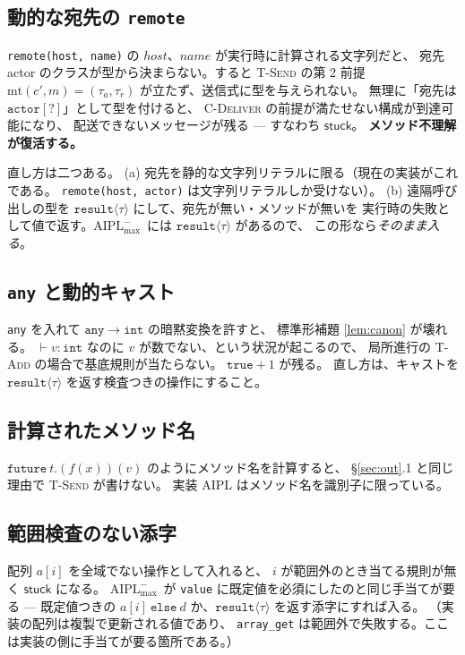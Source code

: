 \documentclass[11pt,a4paper]{ltjsarticle}
\theoremstyle{definition}
\theoremstyle{remark}
\newcommand{\tint}{\ensuremath{\mathtt{int}}}
\newcommand{\tact}[1]{\ensuremath{\mathtt{actor}[#1]}}
\newcommand{\tres}[1]{\ensuremath{\mathtt{result}\langle #1 \rangle}}
\newcommand{\mtab}{\mathrm{mt}}
\newcommand{\stuck}{\textsf{stuck}}
\newcommand{\Amax}{\ensuremath{\mathrm{AIPL}^{-}_{\max}}}
\begin{document}
\subsection{動的な宛先の \texttt{remote}}

\texttt{remote(host, name)} の $host$、$name$ が実行時に計算される文字列だと、
宛先 actor のクラスが型から決まらない。すると \textsc{T-Send} の第 2 前提
$\mtab(c',m) = (\tau_a,\tau_r)$ が立たず、送信式に型を与えられない。
無理に「宛先は \tact{?}」として型を付けると、
\textsc{C-Deliver} の前提が満たせない構成が到達可能になり、
配送できないメッセージが残る --- すなわち $\stuck$。
\textbf{メソッド不理解が復活する。}

直し方は二つある。
(a) 宛先を静的な文字列リテラルに限る（現在の実装がこれである。
    \texttt{remote(host, actor)} は文字列リテラルしか受けない）。
(b) 遠隔呼び出しの型を \tres{\tau} にして、宛先が無い・メソッドが無いを
    実行時の失敗として値で返す。\Amax\ には \tres{\tau} があるので、
    この形なら\emph{そのまま入る}。

\subsection{\texttt{any} と動的キャスト}

\texttt{any} を入れて $\mathtt{any} \to \tint$ の暗黙変換を許すと、
標準形補題 \ref{lem:canon} が壊れる。
$\vdash v : \tint$ なのに $v$ が数でない、という状況が起こるので、
局所進行の \textsc{T-Add} の場合で基底規則が当たらない。
$\mathtt{true} + 1$ が残る。
直し方は、キャストを \tres{\tau} を返す検査つきの操作にすること。

\subsection{計算されたメソッド名}

$\mathtt{future}\ t.(f(x))(v)$ のようにメソッド名を計算すると、
\S\ref{sec:out}.1 と同じ理由で \textsc{T-Send} が書けない。
実装 AIPL はメソッド名を識別子に限っている。

\subsection{範囲検査のない添字}

配列 $a[i]$ を全域でない操作として入れると、
$i$ が範囲外のとき当てる規則が無く $\stuck$ になる。
\Amax\ が \texttt{value} に既定値を必須にしたのと同じ手当てが要る ---
既定値つきの $a[i]\ \mathtt{else}\ d$ か、\tres{\tau} を返す添字にすれば入る。
（実装の配列は複製で更新される値であり、
\texttt{array\_get} は範囲外で失敗する。ここは実装の側に手当てが要る箇所である。）
\end{document}

